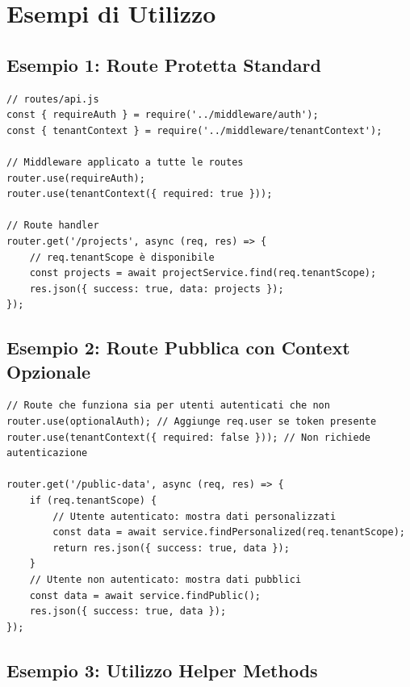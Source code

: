 \documentclass[11pt,a4paper]{article}
\begin{document}
\section{Esempi di Utilizzo}

\subsection{Esempio 1: Route Protetta Standard}

\begin{lstlisting}
// routes/api.js
const { requireAuth } = require('../middleware/auth');
const { tenantContext } = require('../middleware/tenantContext');

// Middleware applicato a tutte le routes
router.use(requireAuth);
router.use(tenantContext({ required: true }));

// Route handler
router.get('/projects', async (req, res) => {
    // req.tenantScope è disponibile
    const projects = await projectService.find(req.tenantScope);
    res.json({ success: true, data: projects });
});
\end{lstlisting}

\subsection{Esempio 2: Route Pubblica con Context Opzionale}

\begin{lstlisting}
// Route che funziona sia per utenti autenticati che non
router.use(optionalAuth); // Aggiunge req.user se token presente
router.use(tenantContext({ required: false })); // Non richiede autenticazione

router.get('/public-data', async (req, res) => {
    if (req.tenantScope) {
        // Utente autenticato: mostra dati personalizzati
        const data = await service.findPersonalized(req.tenantScope);
        return res.json({ success: true, data });
    }
    // Utente non autenticato: mostra dati pubblici
    const data = await service.findPublic();
    res.json({ success: true, data });
});
\end{lstlisting}

\subsection{Esempio 3: Utilizzo Helper Methods}
\end{document}
